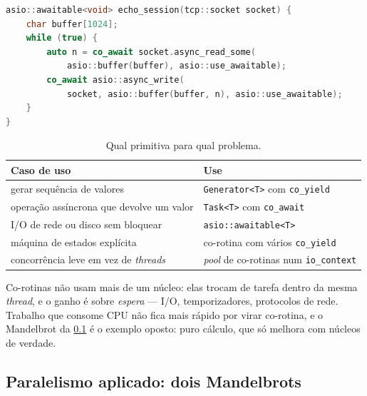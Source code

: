 \begin{lstlisting}[style=bt, language=C++,
    caption={Uma sessão inteira, escrita como se fosse síncrona.}]
asio::awaitable<void> echo_session(tcp::socket socket) {
    char buffer[1024];
    while (true) {
        auto n = co_await socket.async_read_some(
            asio::buffer(buffer), asio::use_awaitable);
        co_await asio::async_write(
            socket, asio::buffer(buffer, n), asio::use_awaitable);
    }
}
\end{lstlisting}

\begin{table}[htbp]
\centering
\caption{Qual primitiva para qual problema.}
\label{tab:escolha-corotina}
\footnotesize
\begin{tabular}{@{}ll@{}}
\toprule
\textbf{Caso de uso} & \textbf{Use} \\
\midrule
gerar sequência de valores                & \texttt{Generator<T>} com \texttt{co\_yield} \\
operação assíncrona que devolve um valor  & \texttt{Task<T>} com \texttt{co\_await} \\
I/O de rede ou disco sem bloquear         & \texttt{asio::awaitable<T>} \\
máquina de estados explícita              & co-rotina com vários \texttt{co\_yield} \\
concorrência leve em vez de \emph{threads}& \emph{pool} de co-rotinas num \texttt{io\_context} \\
\bottomrule
\end{tabular}
\end{table}

\begin{regra}
Co-rotinas não usam mais de um núcleo: elas trocam de tarefa dentro da mesma
\emph{thread}, e o ganho é sobre \emph{espera} --- I/O, temporizadores, protocolos
de rede. Trabalho que consome CPU não fica mais rápido por virar co-rotina, e o
Mandelbrot da \cref{sec:mandelbrot} é o exemplo oposto: puro cálculo, que só
melhora com núcleos de verdade.
\end{regra}

\subsection{Paralelismo aplicado: dois Mandelbrots}
\label{sec:mandelbrot}

